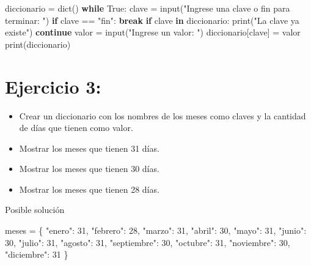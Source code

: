 \documentclass[
  a4paper,
  DIV=11,
  numbers=noendperiod,
  onepage,
  openany]{scrreprt}
\newenvironment{Shaded}{\begin{snugshade}}{\end{snugshade}}
\newcommand{\BuiltInTok}[1]{\textcolor[rgb]{0.00,0.23,0.31}{#1}}
\newcommand{\ControlFlowTok}[1]{\textcolor[rgb]{0.00,0.23,0.31}{\textbf{#1}}}
\newcommand{\DecValTok}[1]{\textcolor[rgb]{0.68,0.00,0.00}{#1}}
\newcommand{\KeywordTok}[1]{\textcolor[rgb]{0.00,0.23,0.31}{\textbf{#1}}}
\newcommand{\NormalTok}[1]{\textcolor[rgb]{0.00,0.23,0.31}{#1}}
\newcommand{\OperatorTok}[1]{\textcolor[rgb]{0.37,0.37,0.37}{#1}}
\newcommand{\StringTok}[1]{\textcolor[rgb]{0.13,0.47,0.30}{#1}}
\newcommand{\VariableTok}[1]{\textcolor[rgb]{0.07,0.07,0.07}{#1}}
\providecommand{\tightlist}{%
  \setlength{\itemsep}{0pt}\setlength{\parskip}{0pt}}\usepackage{longtable,booktabs,array}
\begin{document}
\begin{tcolorbox}
\begin{Shaded}
\begin{Highlighting}[]
\NormalTok{diccionario }\OperatorTok{=} \BuiltInTok{dict}\NormalTok{()}
\ControlFlowTok{while} \VariableTok{True}\NormalTok{:}
\NormalTok{    clave }\OperatorTok{=} \BuiltInTok{input}\NormalTok{(}\StringTok{"Ingrese una clave o \textquotesingle{}fin\textquotesingle{} para terminar: "}\NormalTok{)}
    \ControlFlowTok{if}\NormalTok{ clave }\OperatorTok{==} \StringTok{"fin"}\NormalTok{:}
        \ControlFlowTok{break}
    \ControlFlowTok{if}\NormalTok{ clave }\KeywordTok{in}\NormalTok{ diccionario:}
        \BuiltInTok{print}\NormalTok{(}\StringTok{"La clave ya existe"}\NormalTok{)}
        \ControlFlowTok{continue}
\NormalTok{    valor }\OperatorTok{=} \BuiltInTok{input}\NormalTok{(}\StringTok{"Ingrese un valor: "}\NormalTok{)}
\NormalTok{    diccionario[clave] }\OperatorTok{=}\NormalTok{ valor}
\BuiltInTok{print}\NormalTok{(diccionario)}
\end{Highlighting}
\end{Shaded}

\section{Ejercicio 3:}\label{ejercicio-3-4}

\begin{itemize}
\tightlist
\item
  Crear un diccionario con los nombres de los meses como claves y la
  cantidad de días que tienen como valor.
\item
  Mostrar los meses que tienen 31 días.
\item
  Mostrar los meses que tienen 30 días.
\item
  Mostrar los meses que tienen 28 días.
\end{itemize}

Posible solución

\begin{Shaded}
\begin{Highlighting}[]
\NormalTok{meses }\OperatorTok{=}\NormalTok{ \{}
    \StringTok{"enero"}\NormalTok{: }\DecValTok{31}\NormalTok{,}
    \StringTok{"febrero"}\NormalTok{: }\DecValTok{28}\NormalTok{,}
    \StringTok{"marzo"}\NormalTok{: }\DecValTok{31}\NormalTok{,}
    \StringTok{"abril"}\NormalTok{: }\DecValTok{30}\NormalTok{,}
    \StringTok{"mayo"}\NormalTok{: }\DecValTok{31}\NormalTok{,}
    \StringTok{"junio"}\NormalTok{: }\DecValTok{30}\NormalTok{,}
    \StringTok{"julio"}\NormalTok{: }\DecValTok{31}\NormalTok{,}
    \StringTok{"agosto"}\NormalTok{: }\DecValTok{31}\NormalTok{,}
    \StringTok{"septiembre"}\NormalTok{: }\DecValTok{30}\NormalTok{,}
    \StringTok{"octubre"}\NormalTok{: }\DecValTok{31}\NormalTok{,}
    \StringTok{"noviembre"}\NormalTok{: }\DecValTok{30}\NormalTok{,}
    \StringTok{"diciembre"}\NormalTok{: }\DecValTok{31}
\NormalTok{\}}


\end{Highlighting}
\end{Shaded}
\end{tcolorbox}
\end{document}
